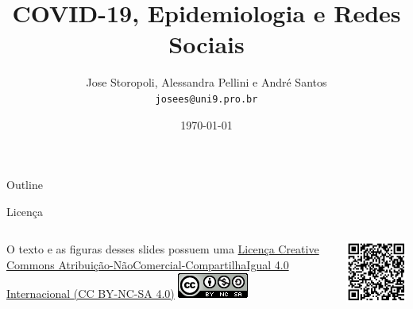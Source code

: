 \documentclass[aspectratio=169]{beamer}                    %
\title[COVID-19, Epidemiologia e Redes Sociais]{COVID-19, Epidemiologia e Redes Sociais}
\author{Jose Storopoli, Alessandra Pellini e André Santos \\
\texttt{josees@uni9.pro.br}}
\institute{Universidade Nove de Julho - UNINOVE}
\date{\today}
\begin{document}
\maketitle

\begin{frame}{Outline}
    \tableofcontents
\end{frame}

\begin{frame}{Licença}
    \begin{columns}
        \begin{column}{0.5\textwidth}
            O texto e as figuras desses slides possuem uma
            \href{https://creativecommons.org/licenses/by-nc-sa/4.0/deed.pt}{Licença
            Creative Commons
            Atribuição-NãoComercial-CompartilhaIgual 4.0 Internacional (CC BY-NC-SA 4.0)}
            \vfill
            \centering
            \includegraphics[width=0.6\columnwidth]{CC_NC_SA.png}
        \end{column}
        \begin{column}{0.5\textwidth}
            \centering
            \includegraphics[width=0.8\columnwidth]{QR_Code.png}
        \end{column}
    \end{columns}
    \vfill
\end{frame}
\end{document}
